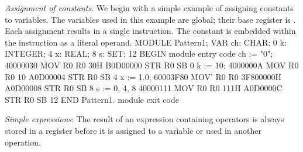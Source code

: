  \emph{Assignment of constants}. We begin with a simple example of assigning constants to variables. The variables used in this example are global; their base register is . Each assignment results in a single instruction. The constant is embedded within the instruction as a literal operand.
\begintt
MODULE Pattern1;
  VAR ch: CHAR;                 0
    k: INTEGER;                 4
    x: REAL;                    8
    s: SET;                     12
BEGIN                                     module entry code
  ch := "0";                    40000030  MOV  R0 R0 30H
                                B0D00000  STR  R0 SB 0
  k := 10;                      4000000A  MOV  R0 R0 10
                                A0D00004  STR  R0 SB 4
  x := 1.0;                     60003F80  MOV' R0 R0 3F800000H
                                A0D00008  STR  R0 SB 8
  s := {0, 4, 8}                40000111  MOV  R0 R0 111H
                                A0D0000C  STR  R0 SB 12
END Pattern1.                             module exit code
\endtt

\noindent {} \emph{Simple expressions}: The result of an expression containing operators is always stored in a register before it is assigned to a variable or used in another operation.


